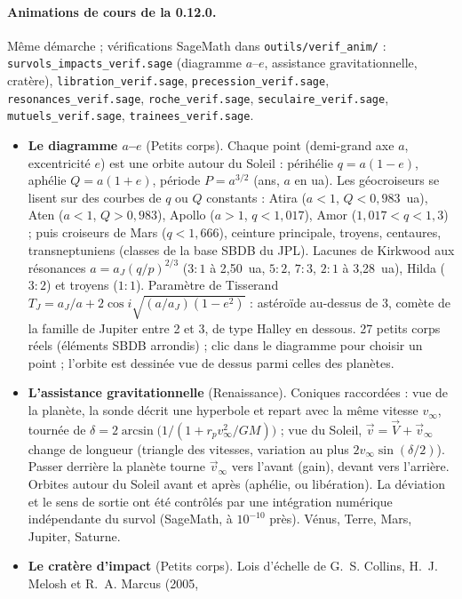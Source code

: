 \paragraph{Animations de cours de la 0.12.0.} Même démarche ; vérifications SageMath dans \texttt{outils/verif\_anim/} :
\texttt{survols\_impacts\_verif.sage} (diagramme $a$--$e$, assistance gravitationnelle, cratère),
\texttt{libration\_verif.sage}, \texttt{precession\_verif.sage}, \texttt{resonances\_verif.sage},
\texttt{roche\_verif.sage}, \texttt{seculaire\_verif.sage}, \texttt{mutuels\_verif.sage}, \texttt{trainees\_verif.sage}.
\begin{itemize}
\item \textbf{Le diagramme $a$--$e$} (Petits corps). Chaque point (demi-grand axe $a$, excentricité $e$) est une orbite
autour du Soleil : périhélie $q=a(1-e)$, aphélie $Q=a(1+e)$, période $P=a^{3/2}$ (ans, $a$ en ua). Les géocroiseurs se
lisent sur des courbes de $q$ ou $Q$ constants : Atira ($a<1$, $Q<0{,}983$~ua), Aten ($a<1$, $Q>0{,}983$), Apollo
($a>1$, $q<1{,}017$), Amor ($1{,}017<q<1{,}3$) ; puis croiseurs de Mars ($q<1{,}666$), ceinture principale, troyens,
centaures, transneptuniens (classes de la base SBDB du JPL). Lacunes de Kirkwood aux résonances $a=a_J(q/p)^{2/3}$
($3{:}1$ à 2,50~ua, $5{:}2$, $7{:}3$, $2{:}1$ à 3,28~ua), Hilda ($3{:}2$) et troyens ($1{:}1$). Paramètre de Tisserand
$T_J=a_J/a+2\cos i\sqrt{(a/a_J)(1-e^2)}$ : astéroïde au-dessus de 3, comète de la famille de Jupiter entre 2 et 3, de
type Halley en dessous. 27 petits corps réels (éléments SBDB arrondis) ; clic dans le diagramme pour choisir un point ;
l'orbite est dessinée vue de dessus parmi celles des planètes.
\item \textbf{L'assistance gravitationnelle} (Renaissance). Coniques raccordées : vue de la planète, la sonde décrit une
hyperbole et repart avec la même vitesse $v_\infty$, tournée de $\delta=2\arcsin\bigl(1/(1+r_pv_\infty^2/GM)\bigr)$ ;
vue du Soleil, $\vec v=\vec V+\vec v_\infty$ change de longueur (triangle des vitesses, variation au plus
$2v_\infty\sin(\delta/2)$). Passer derrière la planète tourne $\vec v_\infty$ vers l'avant (gain), devant vers l'arrière.
Orbites autour du Soleil avant et après (aphélie, ou libération). La déviation et le sens de sortie ont été contrôlés
par une intégration numérique indépendante du survol (SageMath, à $10^{-10}$ près). Vénus, Terre, Mars, Jupiter, Saturne.
\item \textbf{Le cratère d'impact} (Petits corps). Lois d'échelle de G.~S. Collins, H.~J. Melosh et R.~A. Marcus (2005,

\end{itemize}
